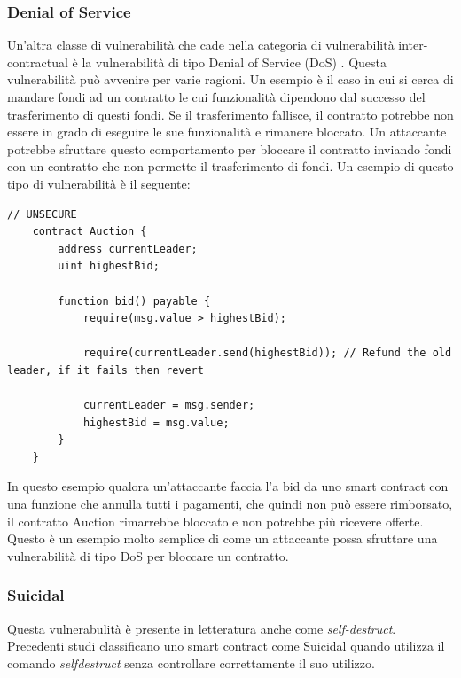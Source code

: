 \documentclass[../../Thesis.tex]{subfiles}
\begin{document}
\subsubsection{Denial of Service}
Un'altra classe di vulnerabilità che cade nella categoria di vulnerabilità inter-contractual è la vulnerabilità di tipo Denial of Service (DoS) \cite{sc-vulnerabilities}. Questa vulnerabilità può avvenire per varie ragioni.
Un esempio è il caso in cui si cerca di mandare fondi ad un contratto le cui funzionalità dipendono dal successo del trasferimento di questi fondi. Se il trasferimento fallisce, il contratto potrebbe non essere in grado di eseguire le sue funzionalità e rimanere bloccato. Un attaccante potrebbe sfruttare questo comportamento per bloccare il contratto inviando fondi con un contratto che non permette il trasferimento di fondi. Un esempio di questo tipo di vulnerabilità è il seguente:

\begin{lstlisting}[language=Solidity]
    // UNSECURE
    contract Auction {
        address currentLeader;
        uint highestBid;
    
        function bid() payable {
            require(msg.value > highestBid);
    
            require(currentLeader.send(highestBid)); // Refund the old leader, if it fails then revert
    
            currentLeader = msg.sender;
            highestBid = msg.value;
        }
    }
\end{lstlisting}
In questo esempio qualora un'attaccante faccia l'a bid da uno smart contract con una funzione che annulla tutti i pagamenti, che quindi non può essere rimborsato, il contratto Auction rimarrebbe bloccato e non potrebbe più ricevere offerte. Questo è un esempio molto semplice di come un attaccante possa sfruttare una vulnerabilità di tipo DoS per bloccare un contratto. 

\subsubsection{Suicidal}
Questa vulnerabulità è presente in letteratura anche come \emph{self-destruct}. Precedenti studi \cite{Suicidal} classificano uno smart contract come Suicidal quando utilizza il comando \emph{selfdestruct} senza controllare correttamente il suo utilizzo. 
\end{document}
